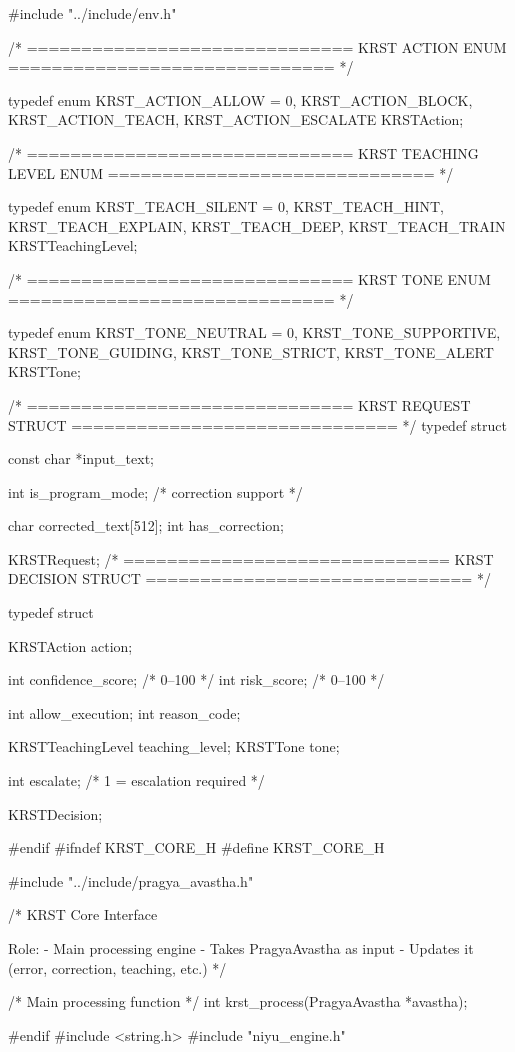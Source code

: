 \documentclass{article}
\begin{document}
#include "../include/env.h"

/* ==============================
   KRST ACTION ENUM
============================== */

typedef enum {
    KRST_ACTION_ALLOW = 0,
    KRST_ACTION_BLOCK,
    KRST_ACTION_TEACH,
    KRST_ACTION_ESCALATE
} KRSTAction;

/* ==============================
   KRST TEACHING LEVEL ENUM
============================== */

typedef enum {
    KRST_TEACH_SILENT = 0,
    KRST_TEACH_HINT,
    KRST_TEACH_EXPLAIN,
    KRST_TEACH_DEEP,
    KRST_TEACH_TRAIN
} KRSTTeachingLevel;

/* ==============================
   KRST TONE ENUM
============================== */

typedef enum {
    KRST_TONE_NEUTRAL = 0,
    KRST_TONE_SUPPORTIVE,
    KRST_TONE_GUIDING,
    KRST_TONE_STRICT,
    KRST_TONE_ALERT
} KRSTTone;

/* ==============================
   KRST REQUEST STRUCT
============================== */
typedef struct
{
    const char *input_text;

     int is_program_mode;
    /* correction support */

    char corrected_text[512];
    int has_correction;

} KRSTRequest;
/* ==============================
   KRST DECISION STRUCT
============================== */

typedef struct {
    KRSTAction action;

    int confidence_score;   /* 0–100 */
    int risk_score;         /* 0–100 */

    int allow_execution;
    int reason_code;

    KRSTTeachingLevel teaching_level;
    KRSTTone tone;

    int escalate;   /* 1 = escalation required */

} KRSTDecision;

#endif
#ifndef KRST_CORE_H
#define KRST_CORE_H

#include "../include/pragya_avastha.h"

/*
    KRST Core Interface

    Role:
    - Main processing engine
    - Takes PragyaAvastha as input
    - Updates it (error, correction, teaching, etc.)
*/

/* Main processing function */
int krst_process(PragyaAvastha *avastha);

#endif
#include <string.h>
#include "niyu_engine.h"
\end{document}
